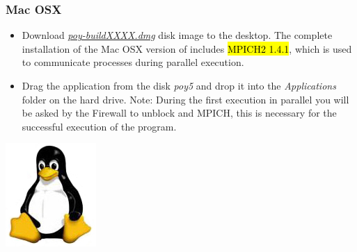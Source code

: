 \begin{flushleft}
\begin{minipage}[t]{0.88\textwidth}
	   	\subsubsection*{Mac OSX}
	\end{minipage}
	            \begin{itemize}
			\item Download
            \href{http://research.amnh.org/scicomp/projects/poy.php}{\emph{poy-buildXXXX.dmg}} disk image 
             to the desktop. The complete installation of the Mac OSX version of \poy includes \hl{MPICH2 1.4.1}, which is used to communicate processes during parallel execution.
            		\item Drag the \poy application from the disk \emph{poy5} and drop it into the \emph{Applications}
            folder on the hard drive.  Note: During the first execution in parallel you will be asked by the Firewall to unblock \poy and MPICH, this is necessary for the successful execution of the program.
		\end{itemize}

	\begin{minipage}[c]{0.074\textwidth}
   		\includegraphics[width=\textwidth]{doc/figures/figlogolinux.jpg}
	\end{minipage}
	\quad
	\begin{minipage}[t]{0.88\textwidth}

\end{minipage}
\end{flushleft}
